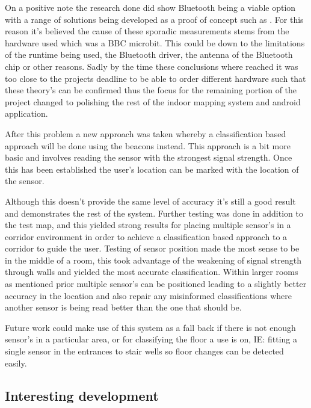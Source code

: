 On a positive note the research done did show Bluetooth being a viable option with a range of solutions being developed as a proof of concept such as \citetemp. For this reason it's believed the cause of these sporadic measurements stems from the hardware used which was a BBC microbit. This could be down to the limitations of the runtime being used, the Bluetooth driver, the antenna of the Bluetooth chip or other reasons. Sadly by the time these conclusions where reached it was too close to the projects deadline to be able to order different hardware such that these theory's can be confirmed thus the focus for the remaining portion of the project changed to polishing the rest of the indoor mapping system and android application.

After this problem a new approach was taken whereby a classification based approach will be done using the beacons instead. This approach is a bit more basic and involves reading the sensor with the strongest signal strength. Once this has been established the user's location can be marked with the location of the sensor.

Although this doesn't provide the same level of accuracy it's still a good result and demonstrates the rest of the system. Further testing was done in addition to the test map, and this yielded strong results for placing multiple sensor's in a corridor environment in order to achieve a classification based approach to a corridor to guide the user. Testing of sensor position made the most sense to be in the middle of a room, this took advantage of the weakening of signal strength through walls and yielded the most accurate classification. Within larger rooms as mentioned prior multiple sensor's can be positioned leading to a slightly better accuracy in the location and also repair any misinformed classifications where another sensor is being read better than the one that should be. 

Future work could make use of this system as a fall back if there is not enough sensor's in a particular area, or for classifying the floor a use is on, IE: fitting a single sensor in the entrances to stair wells so floor changes can be detected easily.

\subsection{Interesting development}
